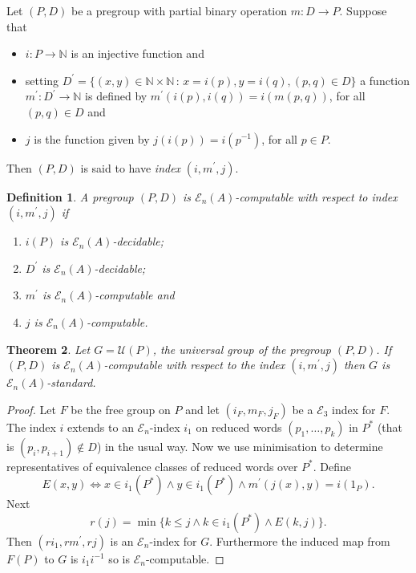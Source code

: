 \documentclass[12pt,a4paper,draft]{article}
\newcommand\cE{\mathcal{E}}
\newcommand\cU{\mathcal{U}}
\newcommand\NN{\mathbb{N}}
\newcommand{\maps}{\longrightarrow}
\newtheorem{theorem}{{\bf Theorem}}[section]
\newtheorem{definition}[theorem]{{\bf Definition}}
\newcommand{\be}{\begin{enumerate}}
\newcommand{\ee}{\end{enumerate}}
\begin{document}
Let $(P,D)$ be a pregroup with partial binary operation 
$m:D\maps P$. Suppose that 
\begin{itemize}
\item 
$i:P\maps \NN$ is an injective function and 
\item setting $D^\prime=
\{(x,y)\in \NN\times \NN\,:\, x=i(p), y=i(q), (p,q)\in D\}$  
a function 
$m^\prime:D^\prime \maps \NN$ is defined  by $m^\prime(i(p),i(q))=i(m(p,q))$, 
for 
all $(p,q)\in D$ 
and 
\item $j$ is the function given
by $j(i(p))=i(p^{-1})$, for all $p\in P$.
\end{itemize}
Then $(P,D)$ is said to have 
{\em index} $(i,m^\prime,j)$. 
\begin{definition}
A pregroup $(P,D)$ is $\cE_n(A)$-{\em computable} with respect to
index $(i,m^\prime,j)$ if 
\be
\item $i(P)$ is $\cE_n(A)$-decidable;
\item $D^\prime$ is $\cE_n(A)$-decidable;
\item $m^\prime$ is $\cE_n(A)$-computable and 
\item $j$ is $\cE_n(A)$-computable.
\ee
\end{definition}
\begin{comment}
Write $(p_1,\ldots ,p_n)\in P$ if, with some bracketing, $p_1\cdots p_n\in P$.
Let $K=\{(p_1,\ldots ,p_n)\in P\,:\, n\ge 1, p_1\cdots p_n=1\}$ and 
let $K^\prime=\{(i(p_1),\ldots ,i(p_n))\,:\,   (p_1,\ldots ,p_n)\in K\}$. 
\begin{definition}
A pregroup $(P,D)$ is $\cE_n(A)$-{\em standard} with respect to
index $(i,m^\prime,j)$ if $K^\prime$ is $\cE_n(A)$-decidable. 
\end{definition}

A subset $X$ of $P$ is a {\em generating set} for $P$ if, for all $p\in P$, 
there exists a sequence $(p_1,\ldots p_n)\in P$ such that 
$p_i\in X\cup X^{-1}$  and, with some choice of bracketing, 
$p_1\cdots p_n=p$.
\end{comment}
 
\begin{theorem}
Let $G=\cU(P)$, the universal group of the pregroup $(P,D)$. 
If $(P,D)$ %
is $\cE_n(A)$-computable with respect 
to the index $(i,m^\prime,j)$ then $G$ is $\cE_{n}(A)$-standard.
\end{theorem}
\begin{proof}
Let $F$ be the free group on $P$ and let $(i_F, m_F, j_F)$ be 
a $\cE_3$ index for $F$. The index $i$ extends to an $\cE_n$-index
$i_1$ on reduced words $(p_1,\ldots, p_k)$ in $P^*$ (that is $(p_i,p_{i+1})\notin
D$) in the usual way. 
Now we use minimisation to determine representatives of 
equivalence classes of reduced words over $P^*$. 
Define 
\[E(x,y)\iff x\in i_1(P^*)\wedge y\in i_1(P^*)\wedge m^\prime(j(x),y)=i(1_P).\]
Next 
\[r(j)=\min\{k\le j\wedge k\in i_1(P^*) \wedge E(k,j)\}.\]
Then $(ri_1,rm^\prime,rj)$ is an $\cE_n$-index for $G$. Furthermore 
the induced map from $F(P)$ to $G$ is $i_1i^{-1}$ so is $\cE_n$-computable.
\end{proof}
\end{document}
